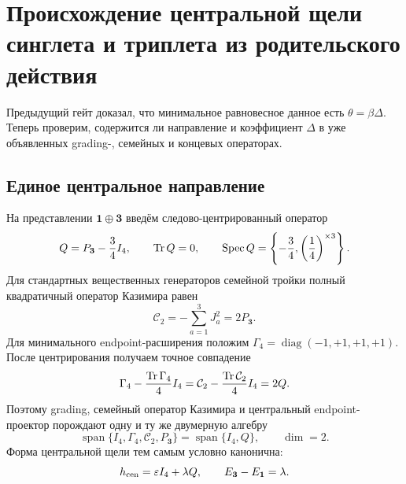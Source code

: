 \chapter{Происхождение центральной щели синглета и триплета из родительского действия}
\label{ch:v8-baryon-c0-singlet-triplet-central-gap-parent-action-origin-gate}

Предыдущий гейт доказал, что минимальное равновесное данное есть
$\theta=\beta\Delta$. Теперь проверим, содержится ли направление и
коэффициент $\Delta$ в уже объявленных grading-, семейных и концевых
операторах.

\section{Единое центральное направление}

На представлении $\mathbf1\oplus\mathbf3$ введём следово-центрированный
оператор
\begin{equation}
 Q=P_{\mathbf3}-\frac34I_4,
 \qquad \operatorname{Tr} Q=0,
 \qquad \operatorname{Spec} Q=\left\{-\frac34,\left(\frac14\right)^{\times3}\right\}.
 \label{eq:v8-baryon-c0-central-gap-traceless-direction}
\end{equation}
Для стандартных вещественных генераторов семейной тройки полный
квадратичный оператор Казимира равен
\begin{equation}
 \mathcal C_2=-\sum_{a=1}^{3}J_a^2=2P_{\mathbf3}.
 \label{eq:v8-baryon-c0-family-casimir-central-projector}
\end{equation}
Для минимального endpoint-расширения положим
$\Gamma_4=\operatorname{diag}(-1,+1,+1,+1)$. После центрирования получаем
точное совпадение
\begin{equation}
 \Gamma_4-\frac{\operatorname{Tr}\Gamma_4}{4}I_4
 =\mathcal C_2-\frac{\operatorname{Tr}\mathcal C_2}{4}I_4
 =2Q.
 \label{eq:v8-baryon-c0-centered-grading-casimir-equivalence}
\end{equation}
Поэтому grading, семейный оператор Казимира и центральный endpoint-проектор
порождают одну и ту же двумерную алгебру
\begin{equation}
 \operatorname{span}\{I_4,\Gamma_4,\mathcal C_2,P_{\mathbf3}\}
 =\operatorname{span}\{I_4,Q\},
 \qquad \dim=2.
 \label{eq:v8-baryon-c0-central-gap-seed-algebra}
\end{equation}
Форма центральной щели тем самым условно канонична:
\begin{equation}
 h_{\rm cen}=\varepsilon I_4+\lambda Q,
 \qquad
 E_{\mathbf3}-E_{\mathbf1}=\lambda.
 \label{eq:v8-baryon-c0-central-gap-general-hamiltonian}
\end{equation}

